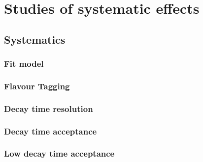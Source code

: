 
\chapter{Studies of systematic effects}
\label{ch:app:measurement_of_sin2beta:systematics}

\section{Systematics}
\label{sec:app:measurement_of_sin2beta:systematics:systematics}

\subsection{Fit model}
\label{sec:app:measurement_of_sin2beta:systematics:systematics:fit_model}

\subsection{Flavour Tagging}
\label{sec:app:measurement_of_sin2beta:systematics:systematics:tagging}

\subsection{Decay time resolution}
\label{sec:app:measurement_of_sin2beta:systematics:systematics:resolution}

\subsection{Decay time acceptance}
\label{sec:app:measurement_of_sin2beta:systematics:systematics:acceptance}

\subsection{Low decay time acceptance}
\label{sec:app:measurement_of_sin2beta:systematics:systematics:acceptance:lower}

